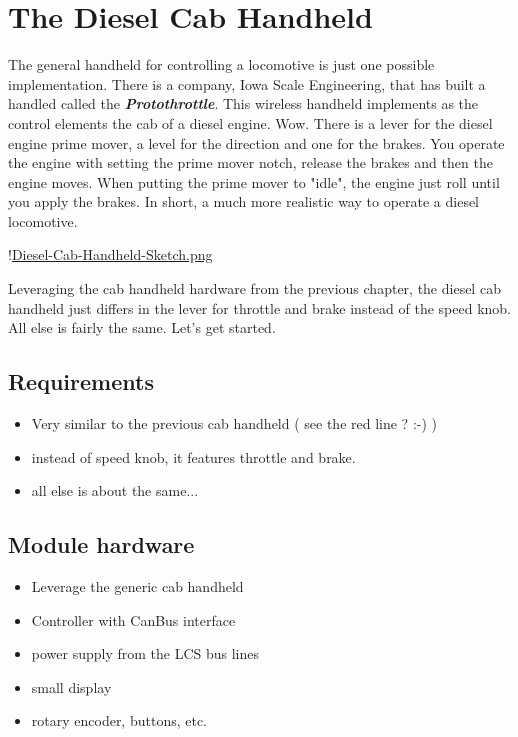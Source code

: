 \chapter{The Diesel Cab Handheld}

The general handheld for controlling a locomotive is just one possible implementation. There is a company, Iowa Scale Engineering, that has built a handled called the \textbf{\textit{Protothrottle}}. This wireless handheld implements as the control elements the cab of a diesel engine. Wow. There is a lever for the diesel engine prime mover, a level for the direction and one for the brakes. You operate the engine with setting the prime mover notch, release the brakes and then the engine moves. When putting the prime mover to "idle", the engine just roll until you apply the brakes. In short, a much more realistic way to operate a diesel locomotive.

!\href{../Figures/Diesel-Cab-Handheld-Sketch.png }{Diesel-Cab-Handheld-Sketch.png}

Leveraging the cab handheld hardware from the previous chapter, the diesel cab handheld just differs in the lever for throttle and brake instead of the speed knob. All else is fairly the same. Let's get started.

\section{Requirements}

\begin{itemize}
\item Very similar to the previous cab handheld ( see the red line ? :-) )
\item instead of speed knob, it features throttle and brake.
\item all else is about the same...
\end{itemize}

\section{Module hardware}

\begin{itemize}
\item Leverage the generic cab handheld
\item Controller with CanBus interface
\item power supply from the LCS bus lines
\item small display
\item rotary encoder, buttons, etc.
\end{itemize}

